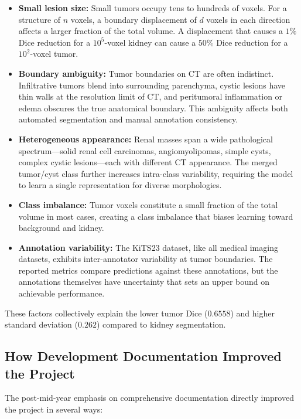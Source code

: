 \begin{itemize}
    \item \textbf{Small lesion size:} Small tumors occupy tens to hundreds of voxels. For a structure of $n$ voxels, a boundary displacement of $d$ voxels in each direction affects a larger fraction of the total volume. A displacement that causes a $1\%$ Dice reduction for a $10^5$-voxel kidney can cause a $50\%$ Dice reduction for a $10^2$-voxel tumor.
    \item \textbf{Boundary ambiguity:} Tumor boundaries on CT are often indistinct. Infiltrative tumors blend into surrounding parenchyma, cystic lesions have thin walls at the resolution limit of CT, and peritumoral inflammation or edema obscures the true anatomical boundary. This ambiguity affects both automated segmentation and manual annotation consistency.
    \item \textbf{Heterogeneous appearance:} Renal masses span a wide pathological spectrum---solid renal cell carcinomas, angiomyolipomas, simple cysts, complex cystic lesions---each with different CT appearance. The merged tumor/cyst class further increases intra-class variability, requiring the model to learn a single representation for diverse morphologies.
    \item \textbf{Class imbalance:} Tumor voxels constitute a small fraction of the total volume in most cases, creating a class imbalance that biases learning toward background and kidney.
    \item \textbf{Annotation variability:} The KiTS23 dataset, like all medical imaging datasets, exhibits inter-annotator variability at tumor boundaries. The reported metrics compare predictions against these annotations, but the annotations themselves have uncertainty that sets an upper bound on achievable performance.
\end{itemize}

These factors collectively explain the lower tumor Dice ($0.6558$) and higher standard deviation ($0.262$) compared to kidney segmentation.

\subsection{How Development Documentation Improved the Project}

The post-mid-year emphasis on comprehensive documentation directly improved the project in several ways:

